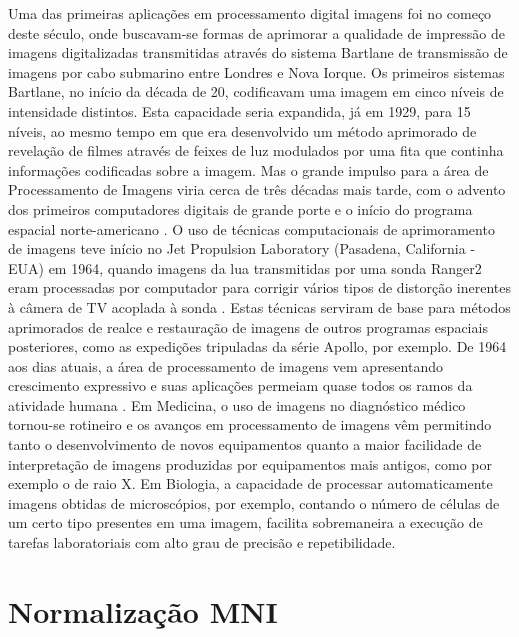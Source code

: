 \documentclass[openright]{UFRGS} %
\begin{document}
Uma das primeiras aplicações em processamento digital imagens foi no começo deste século,
onde buscavam-se formas de aprimorar a qualidade de impressão de imagens digitalizadas
transmitidas através do sistema Bartlane de transmissão de imagens por cabo submarino entre
Londres e Nova Iorque. Os primeiros sistemas Bartlane, no início da década de 20, codificavam
uma imagem em cinco níveis de intensidade distintos. Esta capacidade seria expandida, já em
1929, para 15 níveis, ao mesmo tempo em que era desenvolvido um método aprimorado de
revelação de filmes através de feixes de luz modulados por uma fita que continha informações
codificadas sobre a imagem. Mas o grande impulso para a área de Processamento de Imagens viria cerca de três
décadas mais tarde, com o advento dos primeiros computadores digitais de grande porte e o
início do programa espacial norte-americano \cite{gonzalez2010processamento}. O uso de técnicas computacionais de
aprimoramento de imagens teve início no Jet Propulsion Laboratory (Pasadena, California -
EUA) em 1964, quando imagens da lua transmitidas por uma sonda Ranger2
eram processadas por computador para corrigir vários tipos de distorção inerentes à câmera de TV acoplada à
sonda \cite{gonzalez2010processamento}. Estas técnicas serviram de base para métodos aprimorados de realce e restauração de
imagens de outros programas espaciais posteriores, como as expedições tripuladas da série
Apollo, por exemplo. De 1964 aos dias atuais, a área de processamento de imagens vem apresentando
crescimento expressivo e suas aplicações permeiam quase todos os ramos da atividade humana \cite{de2000processamento}.
Em Medicina, o uso de imagens no diagnóstico médico tornou-se rotineiro e os avanços em
processamento de imagens vêm permitindo tanto o desenvolvimento de novos equipamentos
quanto a maior facilidade de interpretação de imagens produzidas por equipamentos mais
antigos, como por exemplo o de raio X. Em Biologia, a capacidade de processar
automaticamente imagens obtidas de microscópios, por exemplo, contando o número de células
de um certo tipo presentes em uma imagem, facilita sobremaneira a execução de tarefas
laboratoriais com alto grau de precisão e repetibilidade. 






\section{Normalização MNI}
\end{document}
